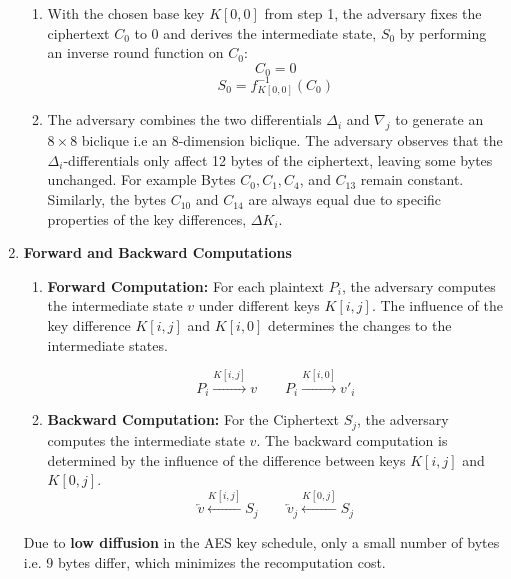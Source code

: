 \documentclass{report}
\begin{document}
\begin{enumerate}[start = 1, label={(\bfseries Step\arabic*):}]
    \begin{enumerate}
        \item With the chosen base key $K[0,0]$ from step 1, the adversary fixes the ciphertext $C_0$ to 0 and derives the intermediate state, $S_0$ by performing an inverse round function on $C_0$:
        \begin{equation}
        C_0 = 0 
        \end{equation}
        \begin{equation}
        S_0 = f_{K[0,0]}^{-1}(C_0)
        \end{equation}
    
        \item The adversary combines the two differentials $\Delta_i$ and $\nabla_j$ to generate an $8 \times 8$ biclique i.e an 8-dimension biclique. The adversary observes that the $\Delta_i$-differentials only affect 12 bytes of the ciphertext, leaving some bytes unchanged. For example Bytes $C_0, C_1, C_4$, and $C_{13}$ remain constant. Similarly, the bytes $C_{10}$ and $C_{14}$ are always equal due to specific properties of the key differences, $\Delta K_i$.
    \end{enumerate}

    \item \textbf{Forward and Backward Computations\cite{bogdanov2011biclique}}\\
    \begin{enumerate}
        \item \textbf{Forward Computation:} For each plaintext $P_i$, the adversary computes the intermediate state $v$ under different keys $K[i,j]$. The influence of the key difference $K[i,j]$ and $K[i,0]$ determines the changes to the intermediate states.
        
        \begin{equation}
            P_i \xrightarrow{K[i,j]} v \quad \quad P_i \xrightarrow{K[i,0]} v'_i
        \end{equation}
    
        \item \textbf{Backward Computation:} For the Ciphertext $S_j$, the adversary computes the intermediate state $v$. The backward computation is determined by the influence of the difference between keys $K[i,j]$ and $K[0,j]$.
        \begin{equation}
            \overleftarrow{v} \xleftarrow{K[i, j]} S_j \quad \quad \overleftarrow{v}_j \xleftarrow{K[0, j]} S_j       
        \end{equation}
    \end{enumerate}
    Due to \textbf{low diffusion} in the AES key schedule, only a small number of bytes i.e. 9 bytes differ, which minimizes the recomputation cost.



\end{enumerate}
\end{document}
